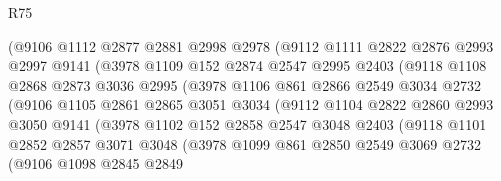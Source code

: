 \begin{lexlean}{R75}
\begin{coremodule}
                    (@9106
                      @1112
                      @2877
                      @2881
                      @2998
                      @2978
                      (@9112
                        @1111
                        @2822
                        @2876
                        @2993
                        @2997
                        @9141
                        (@3978
                          @1109
                          @152
                          @2874
                          @2547
                          @2995
                          @2403
                          (@9118
                            @1108
                            @2868
                            @2873
                            @3036
                            @2995
                            (@3978
                              @1106
                              @861
                              @2866
                              @2549
                              @3034
                              @2732
                              (@9106
                                @1105
                                @2861
                                @2865
                                @3051
                                @3034
                                (@9112
                                  @1104
                                  @2822
                                  @2860
                                  @2993
                                  @3050
                                  @9141
                                  (@3978
                                    @1102
                                    @152
                                    @2858
                                    @2547
                                    @3048
                                    @2403
                                    (@9118
                                      @1101
                                      @2852
                                      @2857
                                      @3071
                                      @3048
                                      (@3978
                                        @1099
                                        @861
                                        @2850
                                        @2549
                                        @3069
                                        @2732
                                        (@9106
                                          @1098
                                          @2845
                                          @2849

\end{coremodule}
\end{lexlean}
